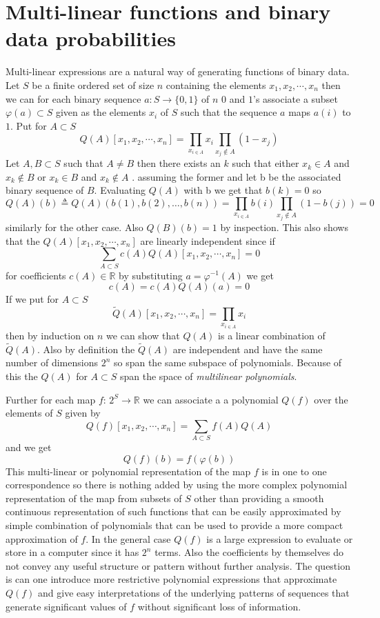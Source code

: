\documentclass[a4paper,oneside,english]{article}
\numberwithin{equation}{section}
\numberwithin{figure}{section}
\begin{document}
\section{Multi-linear functions and binary data probabilities}

Multi-linear expressions are a natural way of generating functions of
binary data. Let $S$ be a finite ordered set of size $n$ containing
the elements $x_{1},x_{2},\cdots,x_{n}$ then we can for each binary
sequence $a:S\rightarrow\{0,1\}$ of $n$ $0$ and $1$'s associate
a subset $\varphi(a)\subset S$ given as the elements $x_{i}$ of
$S$ such that the sequence $a$ maps $a(i)$ to $1$. Put for $A\subset S$
\[
Q(A)[x_{1},x_{2},\cdots,x_{n}]=\prod_{x_{i\in A}}x_{i}\prod_{x_{j}\notin A}(1-x_{j})
\]
Let $A,B\subset S$ such that $A\neq B$ then there exists an $k$
such that either $x_{k}\in A$ and $x_{k}\notin B$ or $x_{k}\in B$
and $x_{k}\notin A$ . assuming the former and let b be the associated
binary sequence of $B$. Evaluating $Q(A)$ with b we get that $b(k)=0$
so 
\[
Q(A)(b)\triangleq Q(A)(b(1),b(2),\ldots,b(n))=\prod_{x_{i\in A}}b(i)\prod_{x_{j}\notin A}(1-b(j))=0
\]
similarly for the other case. Also $Q(B)(b)=1$ by inspection. This
also shows that the $Q(A)[x_{1},x_{2},\cdots,x_{n}]$ are linearly
independent since if
\[
\sum_{A\subset S}c(A)Q(A)[x_{1},x_{2},\cdots,x_{n}]=0
\]
for coefficients $c(A)\in\mathbb{R}$ by substituting $a=\varphi^{-1}(A)$
we get
\[
c(A)=c(A)Q(A)(a)=0
\]
If we put for $A\subset S$
\[
\widetilde{Q}(A)[x_{1},x_{2},\cdots,x_{n}]=\prod_{x_{i\in A}}x_{i}
\]
then by induction on $n$ we can show that $Q(A)$ is a linear combination
of $\widetilde{Q}(A)$. Also by definition the $\widetilde{Q}(A)$
are independent and have the same number of dimensions $2^{n}$ so
span the same subspace of polynomials. Because of this the $Q(A)$
for $A\subset S$ span the space of \emph{multilinear polynomials}.

Further for each map $f:\,2^{S}\rightarrow\mathbb{R}$ we can associate
a a polynomial $Q(f)$ over the elements of $S$ given by
\[
Q(f)[x_{1},x_{2},\cdots,x_{n}]=\sum_{A\subset S}f(A)Q(A)
\]
and we get 
\[
Q(f)(b)=f(\varphi(b))
\]
This multi-linear or polynomial representation of the map $f$ is
in one to one correspondence so there is nothing added by using the
more complex polynomial representation of the map from subsets of
$S$ other than providing a smooth continuous representation of such
functions that can be easily approximated by simple combination of
polynomials that can be used to provide a more compact approximation
of $f$. In the general case $Q(f)$ is a large expression to evaluate
or store in a computer since it has $2^{n}$ terms. Also the coefficients
by themselves do not convey any useful structure or pattern without
further analysis. The question is can one introduce more restrictive
polynomial expressions that approximate $Q(f)$ and give easy interpretations
of the underlying patterns of sequences that generate significant
values of $f$ without significant loss of information.
\end{document}
